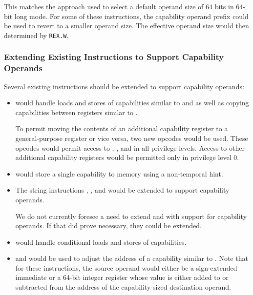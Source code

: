This matches the approach used to select a default operand size of 64
bits in 64-bit long mode.  For some of these instructions, the
capability operand prefix could be used to revert to a smaller operand
size.  The effective operand size would then determined by \texttt{REX.W}.

\subsubsection{Extending Existing Instructions to Support Capability Operands}

Several existing instructions should be extended to support
capability operands:

\begin{itemize}
  \item {} would handle loads and stores of
    capabilities similar to  and  as well as
    copying capabilities between registers similar to .

    To permit moving the contents of an additional capability register
    to a general-purpose register or vice versa, two new
     opcodes would be
    used.  These opcodes would permit access to \CFS{}, \CGS{}, and
    \DDC{} in all privilege levels.  Access to other additional
    capability registers would be permitted only in privilege level 0.

  \item {} would store a single capability to memory
    using a non-temporal hint.

  \item The string instructions , ,
    and  would be extended to support capability
    operands.

    We do not currently foresee a need to extend  and
     with support for capability operands.  If that
    did prove necessary, they could be extended.

  \item {} would handle conditional loads and stores of
    capabilities.

  \item {} and  would be used to adjust
    the address of a capability similar to .  Note
    that for these instructions, the source operand would either be a
    sign-extended immediate or a 64-bit integer register whose value
    is either added to or subtracted from the address of the
    capability-sized destination operand.


\end{itemize}

